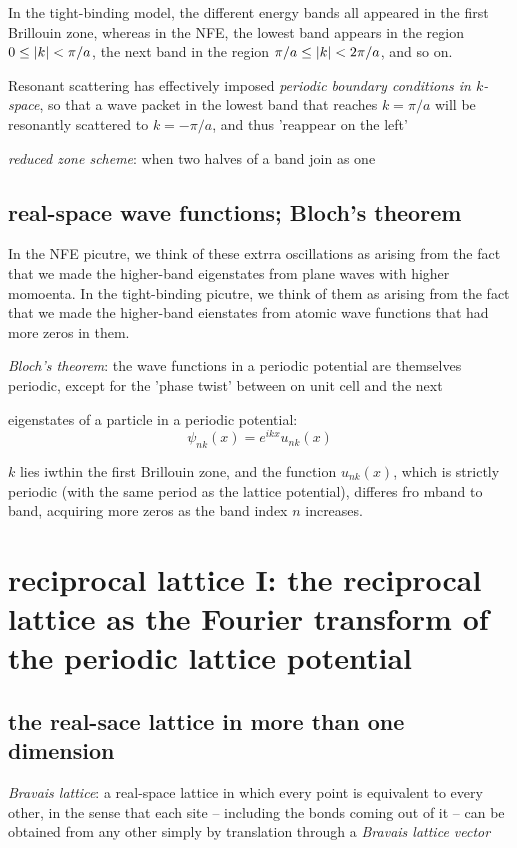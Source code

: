 \documentclass[10pt, a4paper, twocolumn]{article}
\newcommand{\deff}[1]{\par \noindent \textit{#1}: }
\begin{document}
In the tight-binding model, the different energy bands all appeared in the first Brillouin zone, whereas in the NFE, the lowest band appears in the region $0\leq \abs{k} < \pi /a$, the next band in the region $\pi /a\leq \abs{k}< 2\pi /a$, and so on.

Resonant scattering has effectively imposed \emph{periodic boundary conditions in $k$-space}, so that a wave packet in the lowest band that reaches $k=\pi /a$ will be resonantly scattered to $k=-\pi/a$, and thus 'reappear on the left'

\deff{reduced zone scheme} when two halves of a band join as one

\subsection{real-space wave functions; Bloch's theorem}

In the NFE picutre, we think of these extrra oscillations as arising from the fact that we made the higher-band eigenstates from plane waves with higher momoenta. In the tight-binding picutre, we think of them as arising from the fact that we made the higher-band eienstates from atomic wave functions that had more zeros in them.

\deff{Bloch's theorem} the wave functions in a periodic potential are themselves periodic, except for the 'phase twist' between on unit cell and the next

eigenstates of a particle in a periodic potential:
\[\psi _{nk}(x)=e^{ikx}u_{nk}(x)\]

$k$ lies iwthin the first Brillouin zone, and the function $u_{nk}(x)$, which is strictly periodic (with the same period as the lattice potential), differes fro mband to band, acquiring more zeros as the band index $n$ increases.

\section{reciprocal lattice I: the reciprocal lattice as the Fourier transform of the periodic lattice potential}

\subsection{the real-sace lattice in more than one dimension}

\deff{Bravais lattice} a real-space lattice in which every point is equivalent to every other, in the sense that each site -- including the bonds coming out of it -- can be obtained from any other simply by translation through a \emph{Bravais lattice vector}
\end{document}
